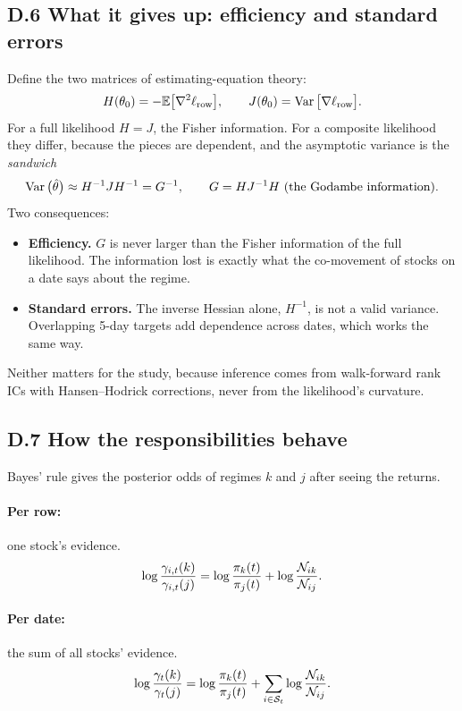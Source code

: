 \subsection*{D.6 What it gives up: efficiency and standard errors}

Define the two matrices of estimating-equation theory:
\begin{equation*}
H(\theta_0)=-\mathbb{E}\big[\nabla^2\ell_{\text{row}}\big],\qquad J(\theta_0)=\operatorname{Var}\big[\nabla\ell_{\text{row}}\big].
\end{equation*}
For a full likelihood $H=J$, the Fisher information. For a composite likelihood they differ, because the pieces are dependent, and the asymptotic variance is the \emph{sandwich}
\begin{equation*}
\operatorname{Var}\big(\hat\theta\big)\approx H^{-1}JH^{-1}=G^{-1},\qquad G=HJ^{-1}H\ \text{(the Godambe information)}.
\end{equation*}
Two consequences:
\begin{itemize}
  \item \textbf{Efficiency.} $G$ is never larger than the Fisher information of the full likelihood. The information lost is exactly what the co-movement of stocks on a date says about the regime.
  \item \textbf{Standard errors.} The inverse Hessian alone, $H^{-1}$, is not a valid variance. Overlapping 5-day targets add dependence across dates, which works the same way.
\end{itemize}
Neither matters for the study, because inference comes from walk-forward rank ICs with Hansen--Hodrick corrections, never from the likelihood's curvature.

\subsection*{D.7 How the responsibilities behave}

Bayes' rule gives the posterior odds of regimes $k$ and $j$ after seeing the returns.

\paragraph{Per row:} one stock's evidence.
\begin{equation*}
\log\frac{\gamma_{i,t}(k)}{\gamma_{i,t}(j)}=\log\frac{\pi_k(t)}{\pi_j(t)}+\log\frac{\mathcal{N}_{ik}}{\mathcal{N}_{ij}}.
\end{equation*}

\paragraph{Per date:} the sum of all stocks' evidence.
\begin{equation*}
\log\frac{\gamma_t(k)}{\gamma_t(j)}=\log\frac{\pi_k(t)}{\pi_j(t)}+\sum_{i\in\mathcal S_t}\log\frac{\mathcal{N}_{ik}}{\mathcal{N}_{ij}}.
\end{equation*}

